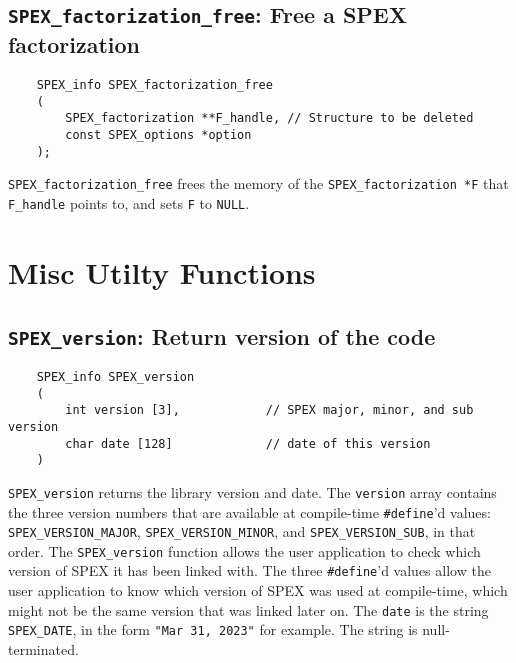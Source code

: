 \documentclass[12pt]{report}
\theoremstyle{definition}
\begin{document}
\subsection{\texttt{SPEX\_factorization\_free}: Free a SPEX factorization} \label{ss:spex_factorization_free}

\newpage %
\begin{mdframed}[userdefinedwidth=6in]
{\footnotesize
\begin{verbatim}
    SPEX_info SPEX_factorization_free
    (
        SPEX_factorization **F_handle, // Structure to be deleted
        const SPEX_options *option
    ); 
\end{verbatim}
} \end{mdframed}

\verb|SPEX_factorization_free| frees the memory of the \verb|SPEX_factorization *F| that \verb|F_handle| points to, and sets \verb|F| to \verb|NULL|.

\section{Misc Utilty Functions}

\subsection{\texttt{SPEX\_version}: Return version of the code}

\begin{mdframed}[userdefinedwidth=6in]
{\footnotesize
\begin{verbatim}
    SPEX_info SPEX_version
    (
        int version [3],            // SPEX major, minor, and sub version
        char date [128]             // date of this version
    )
\end{verbatim}
} \end{mdframed}

\verb|SPEX_version| returns the library version and date.
The \verb'version' array contains the three version
numbers that are available at compile-time \verb'#define''d values:
\verb'SPEX_VERSION_MAJOR',
\verb'SPEX_VERSION_MINOR', and
\verb'SPEX_VERSION_SUB', in that order.  The \verb'SPEX_version' function
allows the user application to check which version of SPEX it has been
linked with.  The three \verb'#define''d values allow the user application
to know which version of SPEX was used at compile-time, which might not
be the same version that was linked later on.
The \verb'date' is the string \verb'SPEX_DATE', in the form
\verb'"Mar 31, 2023"' for example.  The string is null-terminated.
\end{document}
